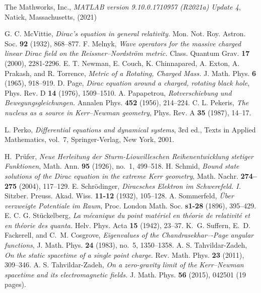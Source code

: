 \documentclass[11 pt]{article}
\renewcommand\({\left(}
\renewcommand\){\right)}
\newcommand\<{\langle}
\renewcommand\>{\rangle}
\newcommand\8{\infty}
\begin{document}
\begin{thebibliography}{10}
{The Mathworks, Inc.},
{\em MATLAB version 9.10.0.1710957 (R2021a) Update 4}, 
Natick, Massachusetts,
(2021)

  G. C. McVittie, 
  \textit{Dirac's equation in general relativity.}
         {Mon. Not. Roy. Astron. Soc.} \textbf{92} (1932), 868--877.
  F. Melnyk, 
  \textit{Wave operators for the massive charged linear Dirac field on the Reissner--Nordstr\"om metric.}
         {Class. Quantum Grav.} \textbf{17} (2000), 2281-2296.
{E. T. Newman, E. Couch, K. Chinnapared, A. Exton, A. Prakash, and R. Tor\-rence},
 \textit{Metric of a Rotating, Charged Mass.}
        {J. Math. Phys.} {\textbf{6}} ({1965}), {918--919}.
 D. Page, 
 \textit{Dirac equation around a charged, rotating black hole},
        {Phys. Rev. D} \textbf{14} (1976), {1509--1510}.
 A. Papapetrou, 
 \textit{Rotverschiebung und Bewegungsgleichungen.}
        {Annalen Phys.} \textbf{452} (1956), 214--224.
  C. L. Pekeris, 
  \textit{The nucleus as a source in Kerr--Newman geometry},
         {Phys. Rev. A} \textbf{35} (1987), {14--17}.
 
L. %
Perko, \emph{Differential equations and dynamical systems}, 3rd ed.,
  Texts in Applied Mathematics, vol.~7, Springer-Verlag, New York, 2001.

H.~Pr{\"u}fer, \emph{Neue {H}erleitung der {S}turm-{L}iouvilleschen {R}eihenentwicklung stetiger {F}unktionen}, Math. Ann. \textbf{95} (1926),
  no.~1, 499--518.
   H. Schmid,  \textit{Bound state solutions of the Dirac equation in the extreme Kerr geometry},
   Math. Nachr. \textbf{274--275} (2004), 117--129. 
 E. Schr\"odinger, 
 \textit{Diracsches {E}lektron im {S}chwerefeld. I.}
        {Sitzber. Preuss. Akad. Wiss.} \textbf{11-12} (1932), 105--128.
  A. Sommerfeld, 
  \textit{{\"U}ber verzweigte {P}otentiale im {R}aum},
  {Proc. London Math. Soc.} \textbf{s1-28} ({1896}), {395--429}.
  {E. C. G. St\"uckelberg},
   \textit{La m\'ecanique du point mat\'eriel en th\'eorie de relativit\'e et en th\'eorie des quanta.}
  {Helv. Phys. Acta} \textbf{15} ({1942}), {23--37}.
K.~G. Suffern, E.~D. Fackerell, and C.~M. Cosgrove, \emph{Eigenvalues of the {C}handrasekhar–-{P}age angular functions}, J. Math. Phys. \textbf{24}
  (1983), no.~5, 1350--1358.
  A. S. Tahvildar-Zadeh, 
  \textit{On the static spacetime of a single point charge.}
         {Rev. Math. Phys.} \textbf{23} (2011), {309--346}.
  A. S. Tahvildar-Zadeh, 
  \textit{On a zero-gravity limit of the Kerr--Newman spacetime and its electromagnetic fields.}
         {J. Math. Phys.} \textbf{56} (2015), 042501 (19 pages).


\end{thebibliography}
\end{document}
